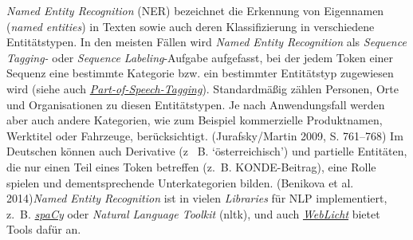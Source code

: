\documentclass{article}
\begin{document}
    \emph{Named Entity Recognition} (NER) bezeichnet die Erkennung von Eigennamen (\emph{named entities}) in Texten sowie auch deren Klassifizierung in verschiedene Entitätstypen. In den meisten Fällen wird \emph{Named Entity Recognition} als \emph{Sequence Tagging-} oder \emph{Sequence Labeling}-Aufgabe aufgefasst, bei der jedem Token einer Sequenz eine bestimmte Kategorie bzw. ein bestimmter Entitätstyp zugewiesen wird (siehe auch \emph{\href{http://gams.uni-graz.at/o:konde.156}{Part-of-Speech-Tagging}}). Standardmäßig zählen Personen, Orte und Organisationen zu diesen Entitätstypen. Je nach Anwendungsfall werden aber auch andere Kategorien, wie zum Beispiel kommerzielle Produktnamen, Werktitel oder Fahrzeuge, berücksichtigt. (Jurafsky/Martin 2009, S. 761–768) Im Deutschen können auch Derivative (z  B. ‘österreichisch’) und partielle Entitäten, die nur einen Teil eines Token betreffen (z. B. KONDE-Beitrag), eine Rolle spielen und dementsprechende Unterkategorien bilden. (Benikova et al. 2014)\emph{Named Entity Recognition} ist in vielen \emph{Libraries} für NLP implementiert, z. B. \emph{\href{http://gams.uni-graz.at/o:konde.170}{spaCy}} oder \emph{Natural Language Toolkit} (nltk), und auch \emph{\href{http://gams.uni-graz.at/o:konde.212}{WebLicht}} bietet Tools dafür an.\\
            
\end{document}
